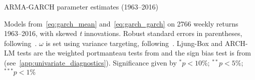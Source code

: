 
\begin{table}
  \centering
  \footnotesize
  \renewcommand{\arraystretch}{1.2}

  \caption{ARMA-GARCH parameter estimates (1963--2016)}

  \begin{longcaption}
    Models from~\autoref{eq:garch_mean} and~\autoref{eq:garch_garch} on \num{2766} weekly returns 1963--2016, with skewed \emph{t} innovations. Robust standard errors in parentheses, following~\textcite{White1982}. $\omega$ is set using variance targeting, following~\textcite{EngleMezrich1995}. Ljung-Box and ARCH-LM tests are the weighted portmanteau tests from \textcite{FisherGallagher2012} and the sign bias test is from \textcite{EngleNg1993} (see~\autoref{app:univariate_diagnostics}). Significance given by $^{*}p<10\%$; $^{**}p<5\%$; $^{***}p<1\%$
  \end{longcaption}
 

\end{table}

